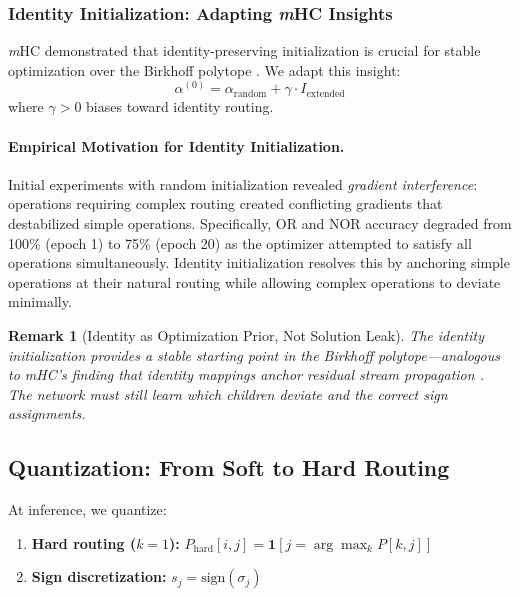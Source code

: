 \documentclass[Royal,times,sageh]{sagej}
\newcommand{\sign}{\text{sign}}
\newcommand{\mHC}{\textit{m}HC}
\newtheorem{remark}{Remark}
\begin{document}
\subsubsection{Identity Initialization: Adapting \mHC{} Insights}

\mHC{} demonstrated that identity-preserving initialization is crucial for stable optimization over the Birkhoff polytope \cite{xie2024mhc, he2016identity}. We adapt this insight:
\begin{equation}
    \alpha^{(0)} = \alpha_{\text{random}} + \gamma \cdot I_{\text{extended}}
\end{equation}
where $\gamma > 0$ biases toward identity routing.

\paragraph{Empirical Motivation for Identity Initialization.}
Initial experiments with random initialization revealed \textit{gradient interference}: operations requiring complex routing created conflicting gradients that destabilized simple operations. Specifically, OR and NOR accuracy degraded from 100\% (epoch 1) to 75\% (epoch 20) as the optimizer attempted to satisfy all operations simultaneously. Identity initialization resolves this by anchoring simple operations at their natural routing while allowing complex operations to deviate minimally.

\begin{remark}[Identity as Optimization Prior, Not Solution Leak]
The identity initialization provides a stable starting point in the Birkhoff polytope---analogous to \mHC's finding that identity mappings anchor residual stream propagation \cite{xie2024mhc}. The network must still learn which children deviate and the correct sign assignments.
\end{remark}

\subsection{Quantization: From Soft to Hard Routing}
\label{sec:quantization}

At inference, we quantize:
\begin{enumerate}
    \item \textbf{Hard routing ($k=1$):} $P_{\text{hard}}[i,j] = \mathbf{1}[j = \arg\max_k P[k, j]]$
    \item \textbf{Sign discretization:} $s_j = \sign(\sigma_j)$
\end{enumerate}
\end{document}
